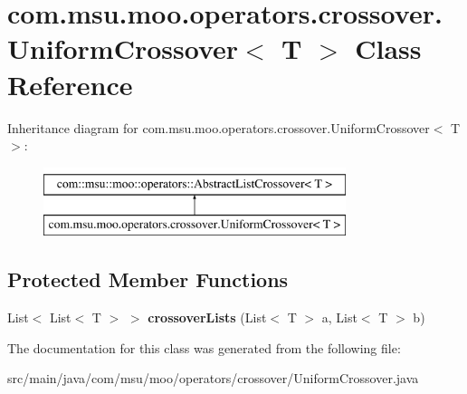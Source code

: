 \hypertarget{classcom_1_1msu_1_1moo_1_1operators_1_1crossover_1_1UniformCrossover_3_01T_01_4}{\section{com.\-msu.\-moo.\-operators.\-crossover.\-Uniform\-Crossover$<$ T $>$ Class Reference}
\label{classcom_1_1msu_1_1moo_1_1operators_1_1crossover_1_1UniformCrossover_3_01T_01_4}
}
Inheritance diagram for com.\-msu.\-moo.\-operators.\-crossover.\-Uniform\-Crossover$<$ T $>$\-:\begin{figure}[H]
\begin{center}
\leavevmode
\includegraphics[height=2.000000cm]{classcom_1_1msu_1_1moo_1_1operators_1_1crossover_1_1UniformCrossover_3_01T_01_4}
\end{center}
\end{figure}
\subsection*{Protected Member Functions}
\begin{DoxyCompactItemize}
\item 
\hypertarget{classcom_1_1msu_1_1moo_1_1operators_1_1crossover_1_1UniformCrossover_3_01T_01_4_a221f734a1c5ac26ddef530e88e7d2ddd}{List$<$ List$<$ T $>$ $>$ {\bfseries crossover\-Lists} (List$<$ T $>$ a, List$<$ T $>$ b)}\label{classcom_1_1msu_1_1moo_1_1operators_1_1crossover_1_1UniformCrossover_3_01T_01_4_a221f734a1c5ac26ddef530e88e7d2ddd}

\end{DoxyCompactItemize}


The documentation for this class was generated from the following file\-:\begin{DoxyCompactItemize}
\item 
src/main/java/com/msu/moo/operators/crossover/Uniform\-Crossover.\-java\end{DoxyCompactItemize}
